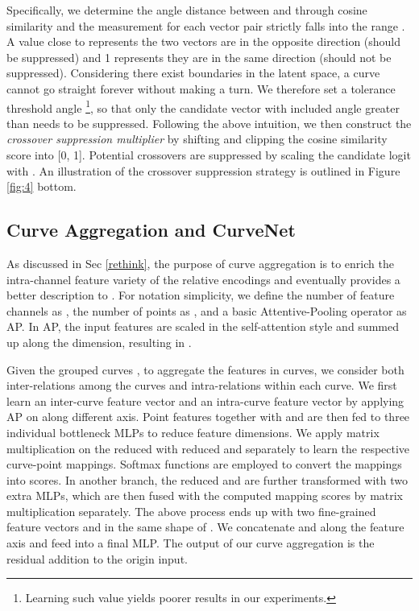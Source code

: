 \documentclass[10pt,twocolumn,letterpaper]{article}
\theoremstyle{definition}
\begin{document}
Specifically, we determine the angle distance between  and  through cosine similarity and the measurement for each vector pair strictly falls into the range . A value close to  represents the two vectors are in the opposite direction (should be suppressed) and 1 represents they are in the same direction (should not be suppressed). Considering there exist boundaries in the latent space, a curve cannot go straight forever without making a turn. We therefore set a tolerance threshold angle  \footnote{Learning such value yields poorer results in our experiments.}, so that only the candidate vector with included angle greater than  needs to be suppressed. Following the above intuition, we then construct the \textit{crossover suppression multiplier}  by shifting and clipping the cosine similarity score into [0, 1]. Potential crossovers are suppressed by scaling the candidate logit  with . An illustration of the crossover suppression strategy is outlined in Figure \ref{fig:4} bottom.





\subsection{Curve Aggregation and CurveNet} \label{ca}

As discussed in Sec \ref{rethink}, the purpose of curve aggregation is to enrich the intra-channel feature variety of the relative encodings  and eventually provides a better description to . For notation simplicity, we define the number of feature channels as , the number of points as , and a basic Attentive-Pooling operator \cite{hu2020randla} as AP. In AP, the input features  are scaled in the self-attention style and summed up along the  dimension, resulting in .




Given the grouped curves , to aggregate the features in curves, we consider both inter-relations among the curves and intra-relations within each curve. We first learn an inter-curve feature vector  and an intra-curve feature vector  by applying AP on  along different axis. Point features  together with  and  are then fed to three individual bottleneck MLPs to reduce feature dimensions. We apply matrix multiplication on the reduced  with reduced  and  separately to learn the respective curve-point mappings. Softmax functions are employed to convert the mappings into scores. In another branch, the reduced  and  are further transformed with two extra MLPs, which are then fused with the computed mapping scores by matrix multiplication separately. The above process ends up with two fine-grained feature vectors  and  in the same shape of . We concatenate  and  along the feature axis and feed into a final MLP. The output of our curve aggregation is the residual addition to the origin input.
\end{document}
